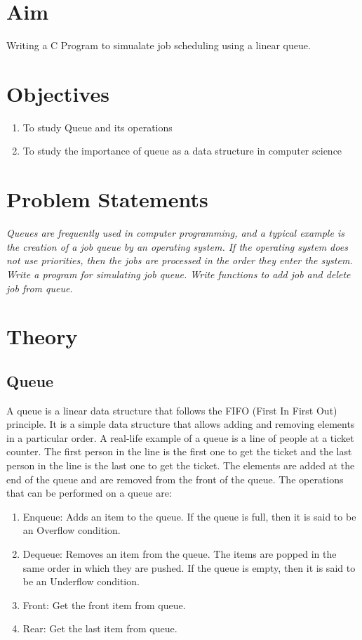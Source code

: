 \documentclass[11pt]{article}
\begin{document}
\tableofcontents
\thispagestyle{empty}
\clearpage
\setcounter{page}{1}

\section{Aim}
Writing a C Program to simualate job scheduling using a linear queue.
\section{Objectives}
\begin{enumerate}
	\item To study Queue and its operations
	\item To study the importance of queue as a data structure in computer science
\end{enumerate}

\section{Problem Statements}
\textit{Queues are frequently used in computer programming, and a typical example is the creation of a
	job queue by an operating system. If the operating system does not use priorities, then the jobs
	are processed in the order they enter the system. Write a program for simulating job queue. Write
	functions to add job and delete job from queue.}

\section{Theory}
\subsection{Queue}
A queue is a linear data structure that follows the FIFO (First In First Out) principle. It is a
simple data structure that allows adding and removing elements in a particular order. A real-life
example of a queue is a line of people at a ticket counter. The first person in the line is the
first one to get the ticket and the last person in the line is the last one to get the ticket. The
elements are added at the end of the queue and are removed from the front of the queue. The
operations that can be performed on a queue are:
\begin{enumerate}
	\item Enqueue: Adds an item to the queue. If the queue is full, then it is said to be an Overflow condition.
	\item Dequeue: Removes an item from the queue. The items are popped in the same order in which they are pushed. If the queue is empty, then it is said to be an Underflow condition.
	\item Front: Get the front item from queue.
	\item Rear: Get the last item from queue.
\end{enumerate}
\end{document}
